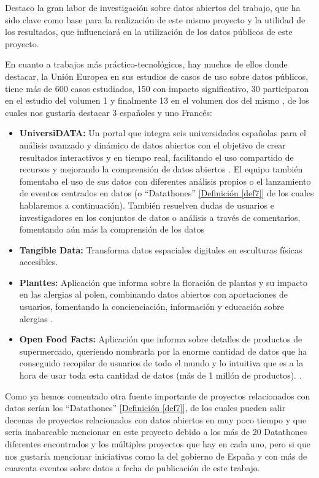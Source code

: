 	Destaco la gran labor de investigación sobre datos abiertos del trabajo, que ha sido clave como base para la realización de este mismo proyecto y la utilidad de los resultados, que influenciará en la utilización de los datos públicos de este proyecto.
	
	En cuanto a trabajos más práctico-tecnológicos, hay muchos de ellos donde destacar, la Unión Europea en sus estudios de casos de uso sobre datos públicos, tiene más de 600 casos estudiados, 150 con impacto significativo, 30 participaron en el estudio del volumen 1 \citep{UseCaseObservatory2022V1} y finalmente 13 en el volumen dos del mismo \citep{UseCaseObservatory2024V2}, de los cuales nos gustaría destacar 3 españoles y uno Francés:
	\begin{itemize}
		\item \textbf{UniversiDATA:} Un portal que integra seis universidades españolas para el análisis avanzado y dinámico de datos abiertos con el objetivo de crear resultados interactivos y en tiempo real, facilitando el uso compartido de recursos y mejorando la comprensión de datos abiertos \citep{UniversiDATA}. El equipo también fomentaba el uso de sus datos con diferentes análisis propios \citep{UniversiDATAAnalisis} o el lanzamiento de eventos centrados en datos (o ``Datathones'' \hyperref[def7]{[Definición \ref*{def7}]} \citep{UniversiDATADatathon} de los cuales hablaremos a continuación). También resuelven dudas de usuarios e investigadores en los conjuntos de datos o análisis a través de comentarios, fomentando aún más la comprensión de los datos 
		\item \textbf{Tangible Data:} Transforma datos espaciales digitales en esculturas físicas accesibles.
		\item \textbf{Planttes:} Aplicación que informa sobre la floración de plantas y su impacto en las alergias al polen, combinando datos abiertos con aportaciones de usuarios, fomentando la concienciación, información y educación sobre alergias \citep{PlanttesDataAPP}.
		\item \textbf{Open Food Facts:} Aplicación que informa sobre detalles de productos de supermercado, queriendo nombrarla por la enorme cantidad de datos que ha conseguido recopilar de usuarios de todo el mundo y lo intuitiva que es a la hora de usar toda esta cantidad de datos (más de 1 millón de productos). \citep{OpenFoodFactsDataAPP}.
	\end{itemize}
	
	Como ya hemos comentado otra fuente importante de proyectos relacionados con datos serían los ``Datathones'' \hyperref[def7]{[Definición \ref*{def7}]}, de los cuales pueden salir decenas de proyectos relacionados con datos abiertos en muy poco tiempo y que seria inabarcable mencionar en este proyecto debido a los más de 20 Datathones diferentes encontrados y los múltiples proyectos que hay en cada uno, pero si que nos gustaría mencionar iniciativas como la del gobierno de España \citep{EventosDatosAbiertosGOB} y \citep{EventosDatathonGOB} con más de cuarenta eventos sobre datos a fecha de publicación de este trabajo.
	
